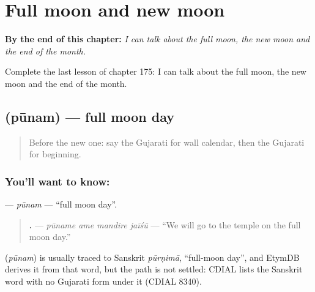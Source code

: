 
\chapter{Full moon and new moon}
\label{ch:gu-full-moon-and-new-moon}

\begin{chapteropening}
\textbf{By the end of this chapter:} \emph{I can talk about the full moon, the new moon and the end of the month.}

Complete the last lesson of chapter 175: I can talk about the full moon, the new moon and the end of the month.
\end{chapteropening}

\section[\texorpdfstring{\gu{પૂનમ} (pūnam)}{પૂનમ (pūnam)}]{ (pūnam) — full moon day}

\label{lesson:GU-C175-punam}



\begin{quote}
Before the new one: say the Gujarati for wall calendar, then the Gujarati for beginning.
\end{quote}

\subsection*{You'll want to know: }
\textbf{} — \emph{pūnam} — \textquotedblleft{}full moon day\textquotedblright{}.

\begin{quote}
\textbf{   .} — \emph{pūname ame mandire jaīśũ} — \textquotedblleft{}We will go to the temple on the full moon day.\textquotedblright{}
\end{quote}

\begin{cousinweb}
\textbf{} (\emph{pūnam}) is usually traced to Sanskrit \emph{pūrṇimā}, \textquotedblleft{}full-moon day\textquotedblright{}, and EtymDB derives it from that word, but the path is not settled: CDIAL lists the Sanskrit word with no Gujarati form under it (CDIAL 8340).
\end{cousinweb}


